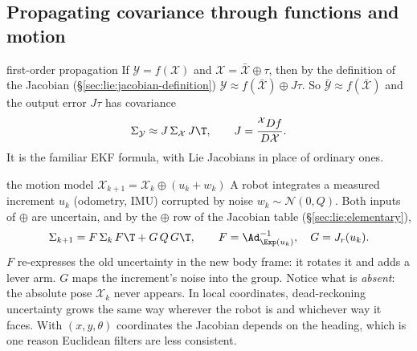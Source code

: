 \subsection{Propagating covariance through functions and motion}\label{sec:lie:propagation}

\begin{deriv}{first-order propagation}
If $\mathcal Y=f(\mathcal X)$ and $\mathcal X=\bar{\mathcal X}\oplus\tau$, then by the definition of the Jacobian (\S\ref{sec:lie:jacobian-definition}) $\mathcal Y\approx f(\bar{\mathcal X})\oplus J\tau$. So $\bar{\mathcal Y}\approx f(\bar{\mathcal X})$ and the output error $J\tau$ has covariance
\[
\Sigma_{\mathcal Y}\approx J\,\Sigma_{\mathcal X}\,J\T,\qquad J=\frac{{}^{\mathcal X}Df}{D\mathcal X}.
\]
It is the familiar EKF formula, with Lie Jacobians in place of ordinary ones.
\end{deriv}

\begin{deriv}{the motion model $\mathcal X_{k+1}=\mathcal X_k\oplus(u_k+w_k)$}
A robot integrates a measured increment $u_k$ (odometry, IMU) corrupted by noise $w_k\sim\mathcal N(0,Q)$. Both inputs of $\oplus$ are uncertain, and by the $\oplus$ row of the Jacobian table (\S\ref{sec:lie:elementary}),
\[
\Sigma_{k+1}=F\,\Sigma_k\,F\T+G\,Q\,G\T,\qquad F=\Ad_{\Exp(u_k)}^{-1},\quad G=J_r(u_k).
\]
$F$ re-expresses the old uncertainty in the new body frame: it rotates it and adds a lever arm. $G$ maps the increment's noise into the group. Notice what is \emph{absent}: the absolute pose $\mathcal X_k$ never appears. In local coordinates, dead-reckoning uncertainty grows the same way wherever the robot is and whichever way it faces. With $(x,y,\theta)$ coordinates the Jacobian depends on the heading, which is one reason Euclidean filters are less consistent.
\end{deriv}
